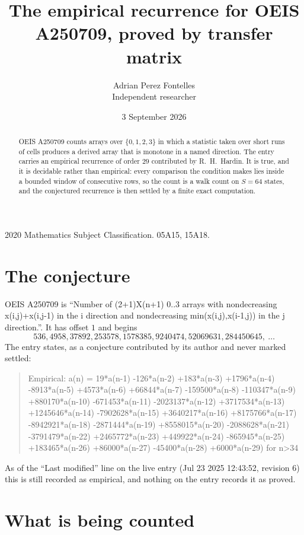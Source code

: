 \documentclass[11pt,a4paper]{article}
\title{The empirical recurrence for OEIS A250709, proved by transfer matrix}
\author{Adrian Perez Fontelles\\ \small Independent researcher}
\date{3 September 2026}
\theoremstyle{plain}
\theoremstyle{definition}
\begin{document}
\maketitle

\begin{abstract}
OEIS A250709 counts arrays over $\{0,1,2,3\}$ in which a statistic taken over short runs
of cells produces a derived array that is monotone in a named direction. The entry carries an
empirical recurrence of order $29$ contributed by R.~H.~Hardin. It is true, and it is
decidable rather than empirical: every comparison the condition makes lies inside a bounded
window of consecutive rows, so the count is a walk count on $S=64$ states, and the
conjectured recurrence is then settled by a finite exact computation.
\end{abstract}

\noindent\small 2020 Mathematics Subject Classification. 05A15, 15A18.\normalsize

\section{The conjecture}

OEIS A250709 is ``Number of (2+1)X(n+1) 0..3 arrays with nondecreasing x(i,j)+x(i,j-1) in the i direction and nondecreasing min(x(i,j),x(i-1,j)) in the j direction.''. It has offset $1$ and begins
\[
536, 4958, 37892, 253578, 1578385, 9240474, 52069631, 284450645,\ \dots
\]
The entry states, as a conjecture contributed by its author and never marked settled:
\begin{quote}
Empirical: a(n) = 19*a(n-1) -126*a(n-2) +183*a(n-3) +1796*a(n-4) -8913*a(n-5) +4573*a(n-6) +66844*a(n-7) -159500*a(n-8) -110347*a(n-9) +880170*a(n-10) -671453*a(n-11) -2023137*a(n-12) +3717534*a(n-13) +1245646*a(n-14) -7902628*a(n-15) +3640217*a(n-16) +8175766*a(n-17) -8942921*a(n-18) -2871444*a(n-19) +8558015*a(n-20) -2088628*a(n-21) -3791479*a(n-22) +2465772*a(n-23) +449922*a(n-24) -865945*a(n-25) +183465*a(n-26) +86000*a(n-27) -45400*a(n-28) +6000*a(n-29) for n>34
\end{quote}
As of the ``Last modified'' line on the live entry (Jul 23 2025 12:43:52, revision 6) this is still
recorded as empirical, and nothing on the entry records it as proved.

\section{What is being counted}
\end{document}
